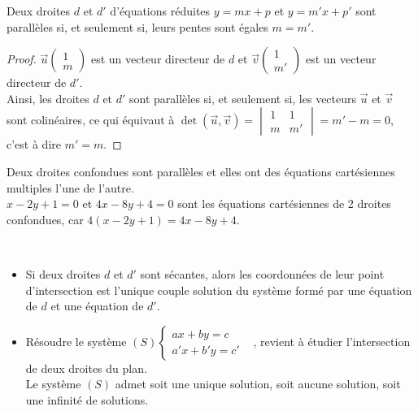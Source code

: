 \begin{Propriété}
Deux droites $d$ et $d'$ d'équations réduites $y=mx+p$ et $y=m'x+p'$ sont parallèles si, et seulement si, leurs pentes sont égales $m=m'$.
\end{Propriété}
\vspace{-0.5cm}
\begin{proof}
$\overrightarrow{u}\begin{pmatrix}
1\\
m
\end{pmatrix}$ est un vecteur directeur de $d$ et  $\overrightarrow{v}\begin{pmatrix}
1\\
m'
\end{pmatrix}$ est un vecteur directeur de $d'$.\\
Ainsi, les droites $d$ et $d'$ sont parallèles si, et seulement si, les vecteurs $\overrightarrow{u}$ et $\overrightarrow{v}$ sont colinéaires, ce qui équivaut à $\det(\overrightarrow{u},\overrightarrow{v})=\begin{vmatrix}
1 & 1\\
m & m'
\end{vmatrix}= m'-m=0$, c'est à dire $m'=m$. 
\end{proof}

\begin{Remarque}
Deux droites confondues sont parallèles et elles ont des équations cartésiennes multiples l'une de l'autre.\\
$x-2y+1=0$ et $4x-8y+4=0$ sont les équations cartésiennes de 2 droites confondues, car $4(x-2y+1)=4x-8y+4$.
\end{Remarque}


\begin{Propriété} $ $
\begin{itemize}[label=\textcolor{Couleur2}{$\bullet$}]
\item Si deux droites $d$ et $d'$ sont sécantes, alors les coordonnées de leur point d'intersection est l'unique couple solution du système formé par une équation de $d$ et une équation de $d'$.
\item Résoudre le système $(S)\left\{
    \begin{array}{ll}
     ax+by=c    & \\
       a'x+b'y=c' & 
    \end{array}
\right.$, revient à étudier l'intersection de deux droites du plan.\\ 
Le système $(S)$ admet soit une unique solution, soit aucune solution, soit une infinité de solutions.
\end{itemize}
\end{Propriété}

